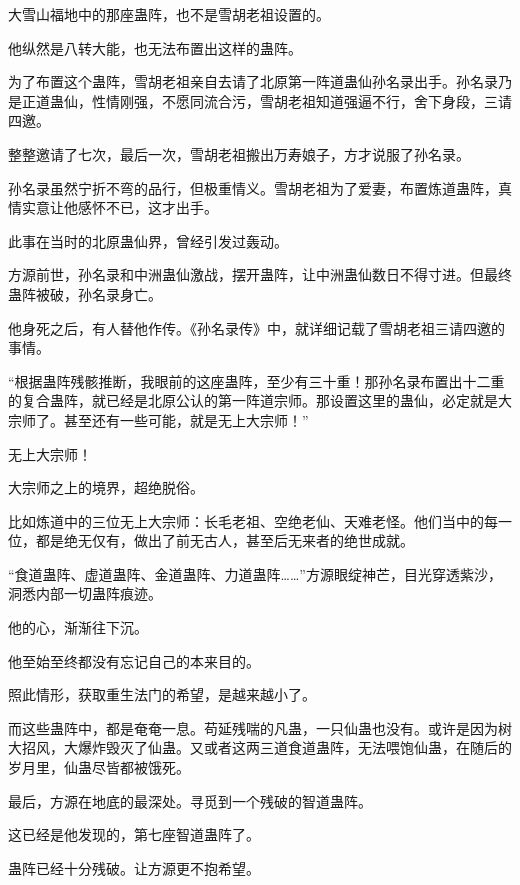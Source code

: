 
\begin{this_body}



大雪山福地中的那座蛊阵，也不是雪胡老祖设置的。

他纵然是八转大能，也无法布置出这样的蛊阵。

为了布置这个蛊阵，雪胡老祖亲自去请了北原第一阵道蛊仙孙名录出手。孙名录乃是正道蛊仙，性情刚强，不愿同流合污，雪胡老祖知道强逼不行，舍下身段，三请四邀。

整整邀请了七次，最后一次，雪胡老祖搬出万寿娘子，方才说服了孙名录。

孙名录虽然宁折不弯的品行，但极重情义。雪胡老祖为了爱妻，布置炼道蛊阵，真情实意让他感怀不已，这才出手。

此事在当时的北原蛊仙界，曾经引发过轰动。

方源前世，孙名录和中洲蛊仙激战，摆开蛊阵，让中洲蛊仙数日不得寸进。但最终蛊阵被破，孙名录身亡。

他身死之后，有人替他作传。《孙名录传》中，就详细记载了雪胡老祖三请四邀的事情。

“根据蛊阵残骸推断，我眼前的这座蛊阵，至少有三十重！那孙名录布置出十二重的复合蛊阵，就已经是北原公认的第一阵道宗师。那设置这里的蛊仙，必定就是大宗师了。甚至还有一些可能，就是无上大宗师！”

无上大宗师！

大宗师之上的境界，超绝脱俗。

比如炼道中的三位无上大宗师：长毛老祖、空绝老仙、天难老怪。他们当中的每一位，都是绝无仅有，做出了前无古人，甚至后无来者的绝世成就。

“食道蛊阵、虚道蛊阵、金道蛊阵、力道蛊阵……”方源眼绽神芒，目光穿透紫沙，洞悉内部一切蛊阵痕迹。

他的心，渐渐往下沉。

他至始至终都没有忘记自己的本来目的。

照此情形，获取重生法门的希望，是越来越小了。

而这些蛊阵中，都是奄奄一息。苟延残喘的凡蛊，一只仙蛊也没有。或许是因为树大招风，大爆炸毁灭了仙蛊。又或者这两三道食道蛊阵，无法喂饱仙蛊，在随后的岁月里，仙蛊尽皆都被饿死。

最后，方源在地底的最深处。寻觅到一个残破的智道蛊阵。

这已经是他发现的，第七座智道蛊阵了。

蛊阵已经十分残破。让方源更不抱希望。


\end{this_body}

